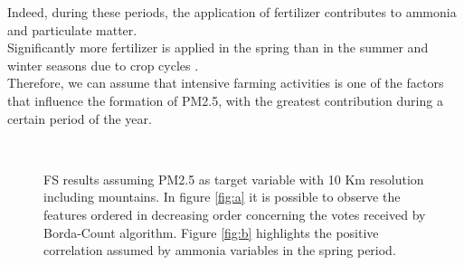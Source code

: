 Indeed, during these periods, the application of fertilizer contributes to ammonia and particulate matter.\\
Significantly more fertilizer is applied in the spring than in the summer and winter seasons due to crop cycles \cite{goebes2003ammonia}.\\
Therefore, we can assume that intensive farming activities  is one of the factors that influence the formation of PM2.5, with the greatest contribution during a certain period of the year.
\begin{figure}[H]
\centering
{}\\
\caption{FS results assuming PM2.5 as target variable with 10 Km resolution including mountains. In figure \ref{fig:a} it is possible to observe the features ordered in decreasing order concerning the votes received by Borda-Count algorithm. Figure \ref{fig:b} highlights the positive correlation assumed by ammonia variables in the spring period. }
\label{fig:fs_pm25}
\end{figure}

